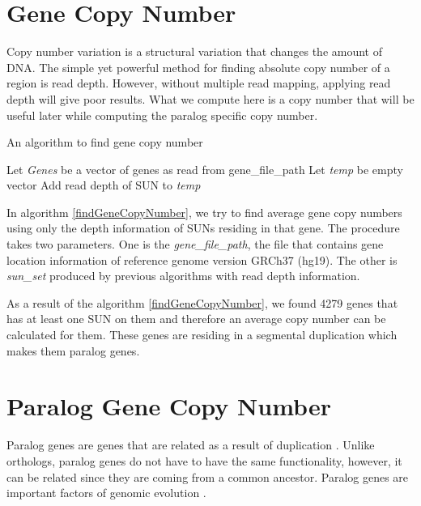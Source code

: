 \section{Gene Copy Number}
Copy number variation is a structural variation that changes the amount of DNA. The simple yet powerful method for finding absolute copy number of a region is read depth. However, without multiple read mapping, applying read depth will give poor results. What we compute here is a copy number that will be useful later while computing the paralog specific copy number.

\begin{algorithm}
\caption{An algorithm to find gene copy number}
\label{findGeneCopyNumber}
\begin{algorithmic}[1]
\State Let \textit{Genes} be a vector of genes as read from gene\_file\_path
\State Let \textit{temp} be empty vector
\State Add read depth of SUN to \textit{temp}
\EndIf
\EndFor
{}
\EndIf
\EndFor
\EndProcedure
\end{algorithmic}
\end{algorithm}

In algorithm \ref{findGeneCopyNumber}, we try to find average gene copy numbers using only the depth information of SUNs residing in that gene. The procedure takes two parameters. One is the \textit{gene\_file\_path}, the file that contains gene location information of reference genome version GRCh37 (hg19). The other is \textit{sun\_set} produced by previous algorithms with read depth information.

As a result of the algorithm \ref{findGeneCopyNumber}, we found 4279 genes that has at least one SUN on them and therefore an average copy number can be calculated for them. These genes are residing in a segmental duplication which makes them paralog genes.

\section{Paralog Gene Copy Number}
Paralog genes are genes that are related as a result of duplication \cite{Moreira2011}. Unlike orthologs, paralog genes do not have to have the same functionality, however, it can be related since they are coming from a common ancestor. Paralog genes are important factors of genomic evolution \cite{koonin2005orthologs}. 

